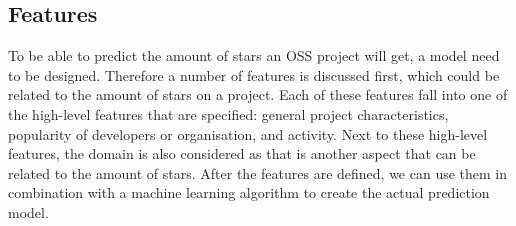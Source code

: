     \subsection{Features}
    To be able to predict the amount of stars an OSS project will get, a model need to be designed.
    Therefore a number of features is discussed first, which could be related to the amount of stars on a project.
    Each of these features fall into one of the high-level features that are specified: general project characteristics, popularity of developers or organisation, and activity.
    Next to these high-level features, the domain is also considered as that is another aspect that can be related to the amount of stars.
    After the features are defined, we can use them in combination with a machine learning algorithm to create the actual prediction model.\\

